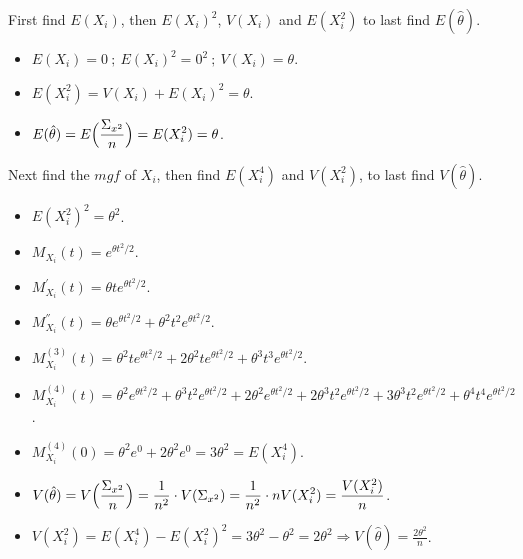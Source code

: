 \documentclass[12pt]{article}
\newcommand{\ds}{\displaystyle}
\begin{document}
\noindent
First find $ E(X_{i}) $, then $ E(X_{i})^{2} $, $ V(X_{i}) $ and $ E(X_{i}^{2}) $ to last find $ E(\hat{\theta}) $. \\

\begin{itemize}
    \item $ \ds E(X_{i}) = 0 \ ; \ E(X_{i})^{2} = 0^{2} \ ; \ V(X_{i}) = \theta $.
    \item $ \ds E(X_{i}^{2}) = V(X_{i}) + E(X_{i})^{2} = \theta $.
    \item $ \ds E(\hat{\theta}) = E\Bigl( \frac{\Sigma_{x^{2}}}{n} \Bigr) = E(X_{i}^{2}) = \theta $.
\end{itemize}

\noindent 
Next find the $ mgf $ of $ X_{i} $, then find $ E(X_{i}^{4}) $ and $ V(X_{i}^{2}) $, to last find $ V(\hat{\theta}) $. \\

\begin{itemize}
    \item $ \ds E(X_{i}^{2})^{2} = \theta^{2} $.
    \item $ \ds M_{X_{i}}(t) = e^{\theta t^{2} / 2} $.
    \item $ \ds M_{X_{i}}^{'}(t) = \theta t e^{\theta t^{2} / 2} $.
    \item $ \ds M_{X_{i}}^{''}(t) = \theta e^{\theta t^{2} / 2} + \theta^{2} t^{2} e^{\theta t^{2} / 2} $.
    \item $ \ds M_{X_{i}}^{(3)}(t) = \theta^{2} t e^{\theta t^{2} / 2} + 2 \theta^{2} t e^{\theta t^{2} / 2} + \theta^{3} t^{3} e^{\theta t^{2} / 2} $.
    \item $ \ds M_{X_{i}}^{(4)}(t) = \theta^{2} e^{\theta t^{2} / 2} + \theta^{3} t^{2} e^{\theta t^{2} / 2} + 2 \theta^{2} e^{\theta t^{2} / 2} + 2 \theta^{3} t^{2} e^{\theta t^{2} / 2} + 3\theta^{3} t^{2} e^{\theta t^{2} / 2} + \theta^{4} t^{4} e^{\theta t^{2} / 2} $.
    \item $ \ds M_{X_{i}}^{(4)}(0) = \theta^{2} e^{0} + 2 \theta^{2} e^{0} = 3\theta^{2} = E(X_{i}^{4})$.
    \item $ \ds V(\hat{\theta}) = V \Bigl( \frac{\Sigma_{x^{2}}}{n} \Bigr) = \frac{1}{n^{2}} \cdot V(\Sigma_{x^{2}}) = \frac{1}{n^{2}} \cdot nV(X_{i}^{2}) = \frac{V(X_{i}^{2})}{n} $.
    \item $ \ds V(X_{i}^{2}) = E(X_{i}^{4}) - E(X_{i}^{2})^{2} = 3\theta^{2} - \theta^{2} = 2\theta^{2} \Rightarrow V(\hat{\theta}) = \frac{2\theta^{2}}{n} $.
\end{itemize}
\end{document}

